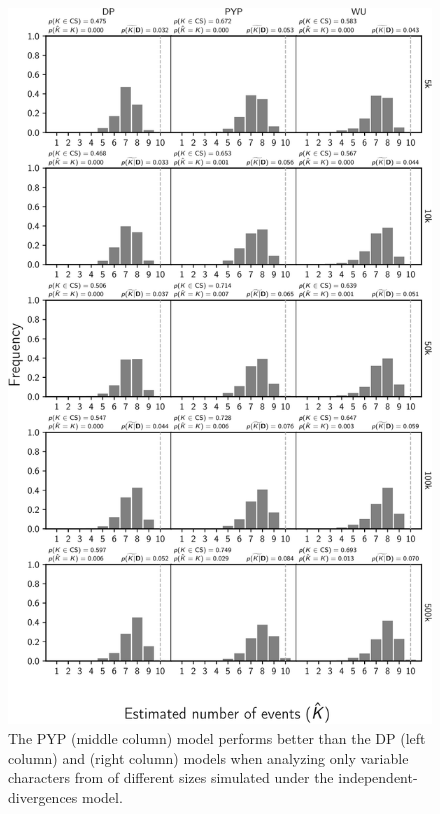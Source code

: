 \begin{figure}[htbp]
    \begin{center}
        \includegraphics[width=\textwidth,height=0.9\textheight,keepaspectratio]{../images/from-project-repo/var-only-nchars-nevents-cropped.pdf}
        \captionsetup{name=Figure S, labelformat=noSpace, listformat=sFigList}
        \caption{\scriptsize
        The PYP (middle column) model performs better than the DP (left column)
        and \wunif (right column) models when analyzing only variable characters
        from \datasets of different sizes simulated under the
        independent-divergences model.
}
\end{center}
\end{figure}
